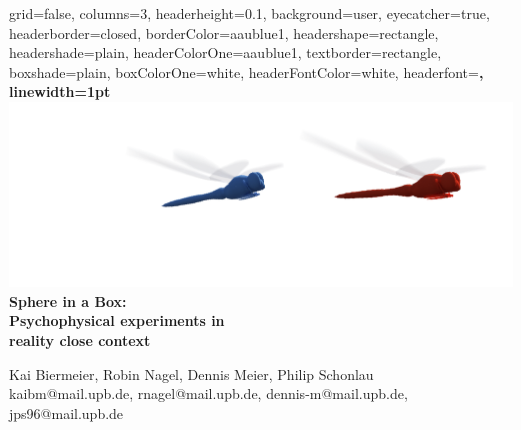 \documentclass[a0paper,portrait]{baposter}
\begin{document}
	
	\begin{poster}{
			grid=false,
			columns=3,
			headerheight=0.1\textheight,
			background=user,
			eyecatcher=true,
			headerborder=closed,
			borderColor=aaublue1,
			headershape=rectangle,
			headershade=plain, %
			headerColorOne=aaublue1,
			textborder=rectangle,
			boxshade=plain,
			boxColorOne=white,
			headerFontColor=white,
			headerfont=\Large\sf\bf,
			linewidth=1pt
		}
		{
			\vspace*{-1cm} \includegraphics[height=.9\headerheight]{UPB_Logo_WEISS_12_libellen2.pdf}
		}
		{\color{white}\bf\smaller
			Sphere in a Box: \\ 
			Psychophysical experiments in \\ reality close context
		}
		{\color{white}\small
			\vspace*{-0.2cm}
			\vspace{1em}Kai Biermeier, Robin Nagel, Dennis Meier, Philip Schonlau\\
			{\smaller kaibm@mail.upb.de, rnagel@mail.upb.de, dennis-m@mail.upb.de, jps96@mail.upb.de}
			
}
\end{poster}
\end{document}
